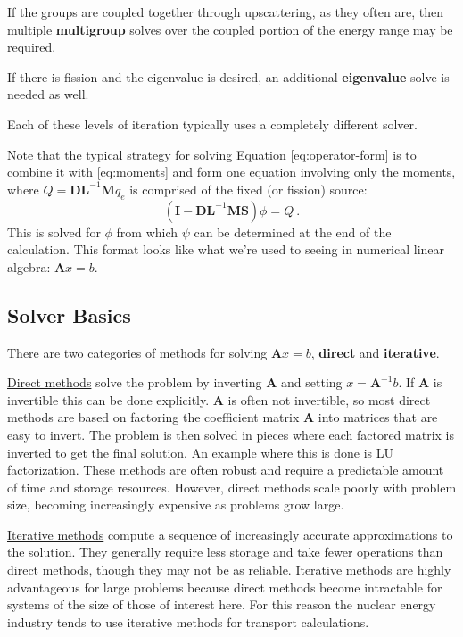 \documentclass[12pt]{article}
\newcommand{\ve}[1]{\ensuremath{\mathbf{#1}}}
\begin{document}
If the groups are coupled together through upscattering, as they often are, then multiple \textbf{multigroup} solves over the coupled portion of the energy range may be required. 

If there is fission and the eigenvalue is desired, an additional \textbf{eigenvalue} solve is needed as well. 

Each of these levels of iteration typically uses a completely different solver. 

Note that the typical strategy for solving Equation \eqref{eq:operator-form} is to combine it with \eqref{eq:moments} and form one equation involving only the moments, where $Q = \ve{DL}^{-1}\ve{M}q_e$ is comprised of the fixed (or fission) source: 
\begin{equation}
   (\ve{I} - \ve{DL}^{-1}\ve{MS})\phi = Q \:.
\end{equation}  
This is solved for $\phi$ from which $\psi$ can be determined at the end of the calculation. This format looks like what we're used to seeing in numerical linear algebra: $\ve{A}x = b$.

\subsection*{Solver Basics}
There are two categories of methods for solving $\ve{A}x = b$, \textbf{direct} and \textbf{iterative}. 

\underline{Direct methods} solve the problem by inverting $\ve{A}$ and setting $x = \ve{A}^{-1}b$. If $\ve{A}$ is invertible this can be done explicitly. $\ve{A}$ is often not invertible, so most direct methods are based on factoring the coefficient matrix $\ve{A}$ into matrices that are easy to invert. The problem is then solved in pieces where each factored matrix is inverted to get the final solution. An example where this is done is LU factorization. These methods are often robust and require a predictable amount of time and storage resources. However, direct methods scale poorly with problem size, becoming increasingly expensive as problems grow large.%

\underline{Iterative methods} compute a sequence of increasingly accurate approximations to the solution. They generally require less storage and take fewer operations than direct methods, though they may not be as reliable. Iterative methods are highly advantageous for large problems because direct methods become intractable for systems of the size of those of interest here. For this reason the nuclear energy industry tends to use iterative methods for transport calculations.%
\end{document}
